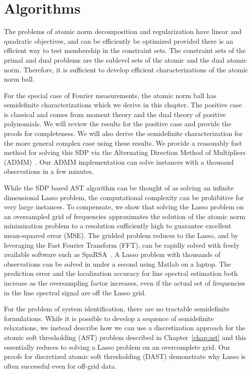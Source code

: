 \chapter{Algorithms}
\label{chap:algos}

The problems of atomic norm decomposition and regularization have linear and
quadratic objectives, and can be efficiently be optimized provided there is an
efficient way to test membership in the constraint sets. The constraint sets of
the primal and dual problems are the sublevel sets of the atomic and the dual
atomic norm. Therefore, it is sufficient to develop efficient characterizations
of the atomic norm ball.

For the special case of Fourier measurements, the atomic norm ball has
semidefinite characterizations which we derive in this chapter. The positive
case is classical and comes from moment theory and the dual theory of positive
polynomials. We will review the results for the positive case and provide the
proofs for completeness. We will also derive the semidefinite characterization
for the more general complex case using these results. We provide a reasonably
fast method for solving this SDP via the Alternating Direction Method of
Multipliers (ADMM)~\cite{BertsekasParallelBook,admm2011}. Our ADMM
implementation can solve instances with a thousand observations in a few
minutes.

While the SDP based AST algorithm can be thought of as solving an infinite
dimensional Lasso problem, the computational complexity can be prohibitive for
very large instances. To compensate, we show that solving the Lasso problem on
an oversampled grid of frequencies approximates the solution of the atomic norm
minimization problem to a resolution sufficiently high to guarantee excellent
mean-squared error (MSE). The gridded problem reduces to the Lasso, and by
leveraging the Fast Fourier Transform (FFT), can be rapidly solved with freely
available software such as SpaRSA~\cite{wright09}. A Lasso problem with
thousands of observations can be solved in under a second using Matlab on a
laptop. The prediction error and the localization accuracy for line spectral
estimation both increase as the oversampling factor increases, even if the
actual set of frequencies in the line spectral signal are off the Lasso grid.

For the problem of system identification, there are no tractable semidefinite
formulations. While it is possible to develop a sequence of semidefinite
relaxations, we instead describe how we can use a discretization approach for
the atomic soft thresholding (AST) problem described in Chapter~\ref{chap:ast}
and this essentially reduces to solving a Lasso problem on an overcomplete grid.
Our proofs for discretized atomic soft thresholding (DAST) demonstrate why Lasso
is often successful even for off-grid data.


